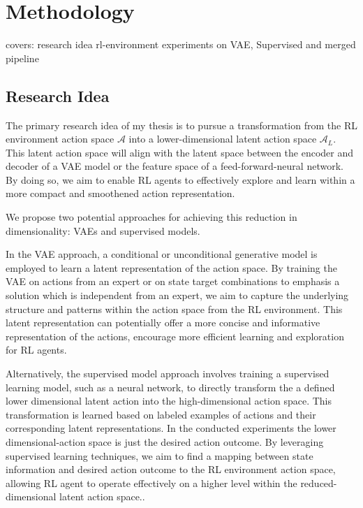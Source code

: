 \chapter{Methodology}\label{chap:Methodology}

covers:
research idea
rl-environment
experiments on VAE, Supervised and merged pipeline

\section{Research Idea}

The primary research idea of my thesis is to pursue a transformation from the RL environment action space $\mathcal{A}$ into a lower-dimensional latent action space $\mathcal{A}_L$. This latent action space will align with the latent space between the encoder and decoder of a VAE model or the feature space of a feed-forward-neural network. By doing so, we aim to enable RL agents to effectively explore and learn within a more compact and smoothened action representation.

We propose two potential approaches for achieving this reduction in dimensionality: VAEs and supervised models.

In the VAE approach, a conditional or unconditional generative model is employed to learn a latent representation of the action space. By training the VAE on actions from an expert or on state target combinations to emphasis a solution which is independent from an expert, we aim to capture the underlying structure and patterns within the action space from the RL environment. This latent representation can potentially offer a more concise and informative representation of the actions, encourage more efficient learning and exploration for RL agents.

Alternatively, the supervised model approach involves training a supervised learning model, such as a neural network, to directly transform the a defined lower dimensional latent action into the high-dimensional action space. This transformation is learned based on labeled examples of actions and their corresponding latent representations. In the conducted experiments the lower dimensional-action space is just the desired action outcome. By leveraging supervised learning techniques, we aim to find a mapping between state information and desired action outcome to the RL environment action space, allowing RL agent to operate effectively on a higher level within the reduced-dimensional latent action space..


